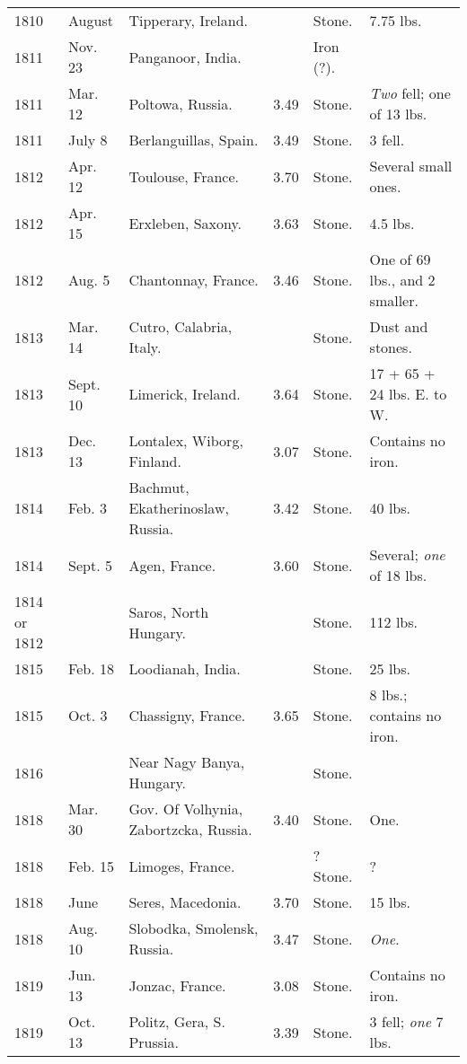 \documentclass[a4paper, 12pt, oneside]{article}
\begin{document}
\begin{center}
\begin{longtable}{|p{10mm}|p{15mm}|p{32mm}|p{13mm}|p{13mm}|p{26mm}|}
        1810 & August & Tipperary, Ireland. & ~ & Stone. & 7.75 lbs. \\
        1811 & Nov. 23 & Panganoor, India. & ~ & Iron (?). & ~ \\
        1811 & Mar. 12 & Poltowa, Russia. & 3.49 & Stone. & \emph{Two} fell; one of 13 lbs. \\
        1811 & July 8 & Berlanguillas, Spain. & 3.49 & Stone. & 3 fell. \\
        1812 & Apr. 12 & Toulouse, France. & 3.70 & Stone. & Several small ones. \\
        1812 & Apr. 15 & Erxleben, Saxony. & 3.63 & Stone. & 4.5 lbs. \\
        1812 & Aug. 5 & Chantonnay, France. & 3.46 & Stone. & One of 69 lbs., and 2 smaller. \\
        1813 & Mar. 14 & Cutro, Calabria, Italy. & ~ & Stone. & Dust and stones. \\
        1813 & Sept. 10 & Limerick, Ireland. & 3.64 & Stone. & 17 + 65 + 24 lbs. E. to W. \\
        1813 & Dec. 13 & Lontalex, Wiborg, Finland. & 3.07 & Stone. & Contains no iron. \\
        1814 & Feb. 3 & Bachmut, Ekatherinoslaw, Russia. & 3.42 & Stone. & 40 lbs. \\
        1814 & Sept. 5 & Agen, France. & 3.60 & Stone. & Several; \emph{one} of 18 lbs. \\
        1814 or 1812 & ~ & Saros, North Hungary. & ~ & Stone. & 112 lbs. \\
        1815 & Feb. 18 & Loodianah, India. & ~ & Stone. & 25 lbs. \\
        1815 & Oct. 3 & Chassigny, France. & 3.65 & Stone. & 8 lbs.; contains no iron. \\
        1816 & ~ & Near Nagy Banya, Hungary. & ~ & Stone. & ~ \\
        1818 & Mar. 30 & Gov. Of Volhynia, Zabortzcka, Russia. & 3.40 & Stone. & One. \\
        1818 & Feb. 15 & Limoges, France. & ~ & ? Stone. & ? \\
        1818 & June & Seres, Macedonia. & 3.70 & Stone. & 15 lbs. \\
        1818 & Aug. 10 & Slobodka, Smolensk, Russia. & 3.47 & Stone. & \emph{One}. \\
        1819 & Jun. 13 & Jonzac, France. & 3.08 & Stone. & Contains no iron. \\
        1819 & Oct. 13 & Politz, Gera, S. Prussia. & 3.39 & Stone. & 3 fell; \emph{one} 7 lbs. \\

\end{longtable}
\end{center}
\end{document}
